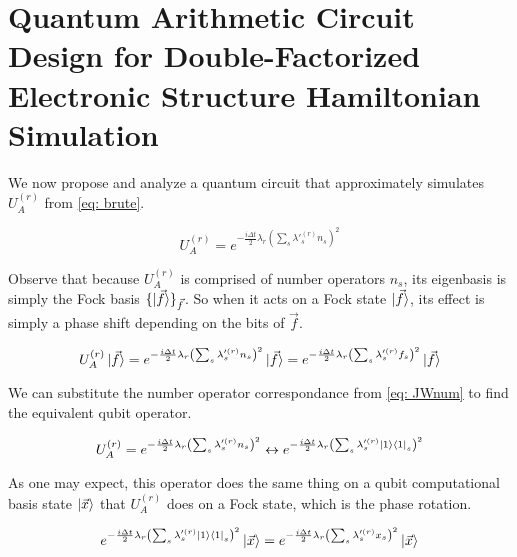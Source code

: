 

\chapter{Quantum Arithmetic Circuit Design for Double-Factorized Electronic Structure Hamiltonian Simulation}

We now propose and analyze a quantum circuit that approximately simulates $U_A^{(r)}$ from \eqref{eq: brute}.

\begin{equation}
    U_A^{(r)} = e^{-\frac{i\Delta t}{2}\lambda_r\left(\sum_s \lambda'^{(r)}_s n_s\right)^2} \label{eq: U_A}
\end{equation}

Observe that because $U_A^{(r)}$ is comprised of number operators $n_s$, its eigenbasis is simply the Fock basis $\{\ket{\vec{f}}\}_{\vec{f}}$. So when it acts on a Fock state $\ket{\vec{f}}$, its effect is simply a phase shift depending on the bits of $\vec{f}$.

\begin{equation}
    U_A^{(r)}\ket{\vec{f}} = e^{-\frac{i\Delta t}{2}\lambda_r\left(\sum_s \lambda'^{(r)}_s n_s\right)^2}\ket{\vec{f}} = e^{-\frac{i\Delta t}{2}\lambda_r\left(\sum_s \lambda'^{(r)}_s f_s\right)^2}\ket{\vec{f}}
\end{equation}

We can substitute the number operator correspondance from \eqref{eq: JWnum} to find the equivalent qubit operator.

\begin{equation}
    U_A^{(r)} = e^{-\frac{i\Delta t}{2}\lambda_r\left(\sum_s \lambda'^{(r)}_s n_s\right)^2} \leftrightarrow e^{-\frac{i\Delta t}{2}\lambda_r\left(\sum_s \lambda'^{(r)}_s \ket{1}\bra{1}_s\right)^2}
\end{equation}

As one may expect, this operator does the same thing on a qubit computational basis state $\ket{\vec{x}}$ that $U_A^{(r)}$ does on a Fock state, which is the phase rotation.

\begin{equation}
    e^{-\frac{i\Delta t}{2}\lambda_r\left(\sum_s \lambda'^{(r)}_s \ket{1}\bra{1}_s\right)^2}\ket{\vec{x}} = e^{-\frac{i\Delta t}{2}\lambda_r\left(\sum_s \lambda'^{(r)}_s x_s\right)^2}\ket{\vec{x}}
\end{equation}

